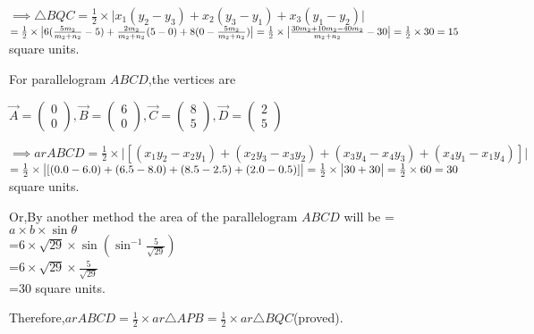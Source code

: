 \documentclass[12pt]{article}
\begin{document}
   
$\implies \triangle BQC = \frac{1}{2}\times \big |x_1(y_2-y_3)+x_2(y_3-y_1)+x_3(y_1-y_2) \big|$\\
$ = \frac{1}{2} \times \big |6(\frac{5m_2}{m_2+n_2}-5)+\frac{2m_2}{m_2+n_2}(5-0)+8(0-\frac{5m_2}{m_2+n_2})\big|\\
 = \frac{1}{2} \times\big |\frac{30m_2+10m_2-40m_2}{m_2+n_2}-30\big|\\
 =\frac{1}{2} \times30\\
 =15 $ square units.

 
  For parallelogram $ABCD$,the vertices are

   $\Vec{A}=\begin{pmatrix}
       0\\0
   \end{pmatrix},
 \Vec{B}=\begin{pmatrix}
       6\\0
   \end{pmatrix},
   \Vec{C}=\begin{pmatrix}
       8\\5
   \end{pmatrix},
   \Vec{D}=\begin{pmatrix}
       2\\5
   \end{pmatrix}$
   
$\implies ar ABCD = \frac{1}{2}\times \big |[(x_1y_2-x_2y_1)+(x_2y_3-x_3y_2)+(x_3y_4-x_4y_3)+(x_4y_1-x_1y_4)] \big|$\\
$ = \frac{1}{2} \times \big |[(0.0-6.0)+(6.5-8.0)+(8.5-2.5)+(2.0-0.5)] \big|
 = \frac{1}{2} \times\big |30+30\big|\\
 =\frac{1}{2} \times60\\
 =30 $ square units.

 
Or,By another method the area of the parallelogram $ABCD$ will be = $ a\times b \times \sin \theta$\\
 =$6\times\sqrt{29}\times \sin(\sin^{-1}{\frac{5}{\sqrt{29}}})$\\
=$6\times \sqrt{29} \times \frac{5}{\sqrt{29}}$\\
=30 square units.

Therefore,$ar ABCD = \frac{1}{2}\times ar \triangle APB = \frac{1}{2}\times ar \triangle BQC$(proved).
\end{document}
